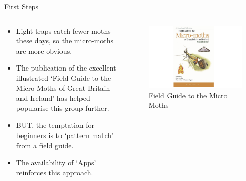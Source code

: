 \documentclass[
  ignorenonframetext,
]{beamer}
\providecommand{\tightlist}{%
  \setlength{\itemsep}{0pt}\setlength{\parskip}{0pt}}
\begin{document}
\begin{frame}{First Steps}
\protect\hypertarget{first-steps}{}
\begin{columns}[T]
\begin{column}{0.5\textwidth}
\begin{itemize}
\tightlist
\item
  Light traps catch fewer moths these days, so the micro-moths are more
  obvious.
\item
  The publication of the excellent illustrated `Field Guide to the
  Micro-Moths of Great Britain and Ireland' has helped popularise this
  group further.
\item
  BUT, the temptation for beginners is to `pattern match' from a field
  guide.
\item
  The availability of `Apps' reinforces this approach.
\end{itemize}
\end{column}

\begin{column}{0.5\textwidth}
\begin{figure}
\centering
\includegraphics{./images/micro-field-guide.jpg}
\caption{Field Guide to the Micro Moths}
\end{figure}
\end{column}
\end{columns}
\end{frame}
\end{document}
